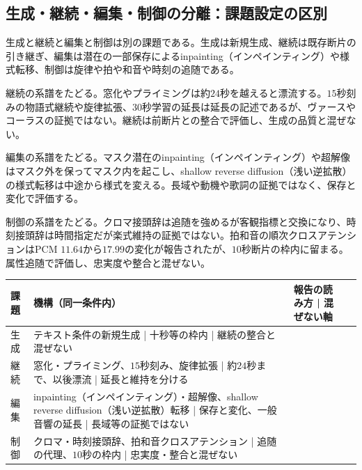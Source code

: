 \documentclass[lualatex,a4paper,10pt]{jlreq}
\begin{document}
\subsection{生成・継続・編集・制御の分離：課題設定の区別}
生成と継続と編集と制御は別の課題である\autocite{btd065,btd067,btd068,btd069}。生成は新規生成、継続は既存断片の引き継ぎ、編集は潜在の一部保存によるinpainting（インペインティング）や様式転移、制御は旋律や拍や和音や時刻の追随である\autocite{btd065,btd067,btd068,btd069}。

継続の系譜をたどる。窓化やプライミングは約$24$秒を越えると漂流する\autocite{btd063}。$15$秒刻みの物語式継続や旋律拡張、$30$秒学習の延長は延長の記述であるが、ヴァースやコーラスの証拠ではない\autocite{btd065}。継続は前断片との整合で評価し、生成の品質と混ぜない\autocite{btd063,btd065}。

編集の系譜をたどる。マスク潜在のinpainting（インペインティング）や超解像はマスク外を保ってマスク内を起こし、shallow reverse diffusion（浅い逆拡散）の様式転移は中途から様式を変える\autocite{btd067}。長域や動機や歌詞の証拠ではなく、保存と変化で評価する\autocite{btd067}。

制御の系譜をたどる。クロマ接頭辞は追随を強めるが客観指標と交換になり、時刻接頭辞は時間指定だが楽式維持の証拠ではない\autocite{btd066,btd068}。拍和音の順次クロスアテンションはPCM $11.64$から$17.99$の変化が報告されたが、$10$秒断片の枠内に留まる\autocite{btd069}。属性追随で評価し、忠実度や整合と混ぜない\autocite{btd066,btd069}。

\begin{center}
\small
\begin{tabularx}{\textwidth}{@{}p{}p{}p{}X@{}}
\toprule
課題 & 機構（同一条件内） & 報告の読み方 | 混ぜない軸 \\
\midrule
生成\autocite{btd065,btd066} & テキスト条件の新規生成 | 十秒等の枠内 | 継続の整合と混ぜない \\
継続\autocite{btd063,btd065} & 窓化・プライミング、$15$秒刻み、旋律拡張 | 約$24$秒まで、以後漂流 | 延長と維持を分ける \\
編集\autocite{btd067} & inpainting（インペインティング）・超解像、shallow reverse diffusion（浅い逆拡散）転移 | 保存と変化、一般音響の延長 | 長域等の証拠ではない \\
制御\autocite{btd066,btd068,btd069} & クロマ・時刻接頭辞、拍和音クロスアテンション | 追随の代理、$10$秒の枠内 | 忠実度・整合と混ぜない \\
\bottomrule
\end{tabularx}
\end{center}
\end{document}
